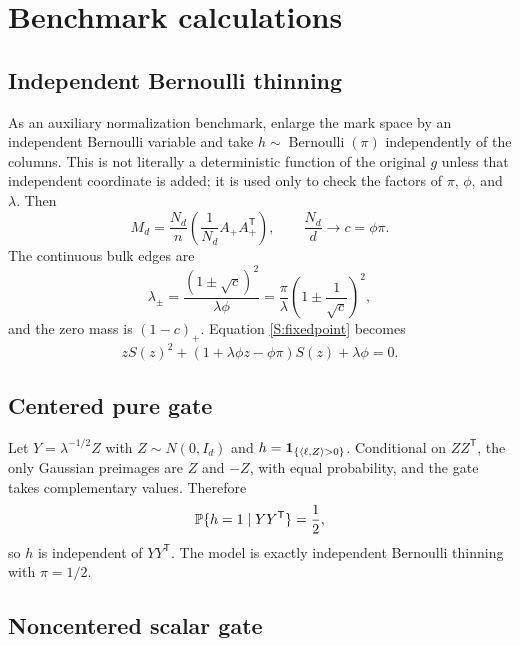 \section{Benchmark calculations}

\subsection{Independent Bernoulli thinning}

As an auxiliary normalization benchmark, enlarge the mark space by an
independent Bernoulli variable and take
$h\sim\operatorname{Bernoulli}(\pi)$ independently of the columns.  This is
not literally a deterministic function of the original $g$ unless that
independent coordinate is added; it is used only to check the factors of
$\pi$, $\phi$, and $\lambda$.  Then
\begin{equation}
M_d=\frac{N_d}{n}
\left(\frac1{N_d}A_+A_+^{\mathsf T}\right),
\qquad
\frac{N_d}{d}\to c=\phi\pi.
\end{equation}
The continuous bulk edges are
\begin{equation}
\lambda_\pm=
\frac{(1\pm\sqrt c)^2}{\lambda\phi}
=
\frac{\pi}{\lambda}
\left(1\pm\frac1{\sqrt c}\right)^2,
\end{equation}
and the zero mass is $(1-c)_+$. Equation \eqref{S:fixedpoint} becomes
\begin{equation}
zS(z)^2+
(1+\lambda\phi z-\phi\pi)S(z)+\lambda\phi=0.
\end{equation}

\subsection{Centered pure gate}

Let $Y=\lambda^{-1/2}Z$ with $Z\sim N(0,I_d)$ and
$h=\mathbf{1}_{\{\langle\ell,Z\rangle>0\}}$. Conditional on $ZZ^{\mathsf T}$, the only Gaussian preimages are $Z$ and $-Z$, with equal probability, and the gate takes complementary values. Therefore
\begin{equation}
\mathbb{P}\{h=1\mid YY^{\mathsf T}\}=\frac12,
\end{equation}
so $h$ is independent of $YY^{\mathsf T}$. The model is exactly independent Bernoulli thinning with $\pi=1/2$.

\subsection{Noncentered scalar gate}

